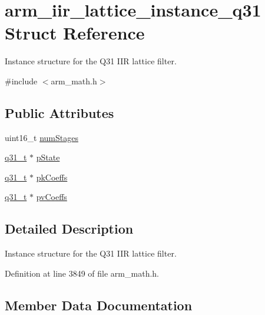 \hypertarget{structarm__iir__lattice__instance__q31}{}\section{arm\+\_\+iir\+\_\+lattice\+\_\+instance\+\_\+q31 Struct Reference}
\label{structarm__iir__lattice__instance__q31}


Instance structure for the Q31 I\+IR lattice filter.  




{\ttfamily \#include $<$arm\+\_\+math.\+h$>$}

\subsection*{Public Attributes}
\begin{DoxyCompactItemize}
\item 
uint16\+\_\+t \hyperlink{structarm__iir__lattice__instance__q31_a9df4570ed28c50fd9193ab654ff236ad}{num\+Stages}
\item 
\hyperlink{arm__math_8h_adc89a3547f5324b7b3b95adec3806bc0}{q31\+\_\+t} $\ast$ \hyperlink{structarm__iir__lattice__instance__q31_a941282745effd26a889fbfadf4b95e6a}{p\+State}
\item 
\hyperlink{arm__math_8h_adc89a3547f5324b7b3b95adec3806bc0}{q31\+\_\+t} $\ast$ \hyperlink{structarm__iir__lattice__instance__q31_a1d30aa16aac7722936ea9dee59211863}{pk\+Coeffs}
\item 
\hyperlink{arm__math_8h_adc89a3547f5324b7b3b95adec3806bc0}{q31\+\_\+t} $\ast$ \hyperlink{structarm__iir__lattice__instance__q31_a04507e2b982b1dfa97b7b55752dea6b9}{pv\+Coeffs}
\end{DoxyCompactItemize}


\subsection{Detailed Description}
Instance structure for the Q31 I\+IR lattice filter. 

Definition at line 3849 of file arm\+\_\+math.\+h.



\subsection{Member Data Documentation}
\mbox{\label{structarm__iir__lattice__instance__q31_a9df4570ed28c50fd9193ab654ff236ad}} 

